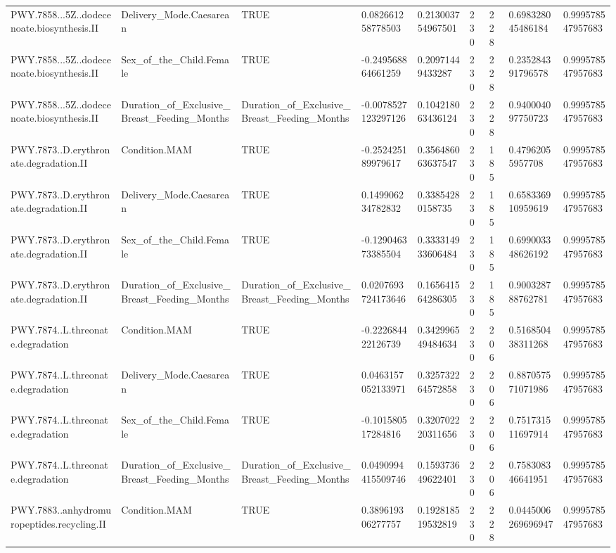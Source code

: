 \begin{longtable}{lllllllll}
PWY.7858...5Z..dodecenoate.biosynthesis.II & Delivery\_Mode.Caesarean & TRUE & 0.082661258778503 & 0.213003754967501 & 230 & 228 & 0.698328045486184 & 0.999578547957683 \\
PWY.7858...5Z..dodecenoate.biosynthesis.II & Sex\_of\_the\_Child.Female & TRUE & -0.249568864661259 & 0.20971449433287 & 230 & 228 & 0.235284391796578 & 0.999578547957683 \\
PWY.7858...5Z..dodecenoate.biosynthesis.II & Duration\_of\_Exclusive\_Breast\_Feeding\_Months & Duration\_of\_Exclusive\_Breast\_Feeding\_Months & -0.0078527123297126 & 0.104218063436124 & 230 & 228 & 0.940004097750723 & 0.999578547957683 \\
PWY.7873..D.erythronate.degradation.II & Condition.MAM & TRUE & -0.252425189979617 & 0.356486063637547 & 230 & 185 & 0.47962055957708 & 0.999578547957683 \\
PWY.7873..D.erythronate.degradation.II & Delivery\_Mode.Caesarean & TRUE & 0.149906234782832 & 0.33854280158735 & 230 & 185 & 0.658336910959619 & 0.999578547957683 \\
PWY.7873..D.erythronate.degradation.II & Sex\_of\_the\_Child.Female & TRUE & -0.129046373385504 & 0.333314933606484 & 230 & 185 & 0.699003348626192 & 0.999578547957683 \\
PWY.7873..D.erythronate.degradation.II & Duration\_of\_Exclusive\_Breast\_Feeding\_Months & Duration\_of\_Exclusive\_Breast\_Feeding\_Months & 0.0207693724173646 & 0.165641564286305 & 230 & 185 & 0.900328788762781 & 0.999578547957683 \\
PWY.7874..L.threonate.degradation & Condition.MAM & TRUE & -0.222684422126739 & 0.342996549484634 & 230 & 206 & 0.516850438311268 & 0.999578547957683 \\
PWY.7874..L.threonate.degradation & Delivery\_Mode.Caesarean & TRUE & 0.0463157052133971 & 0.325732264572858 & 230 & 206 & 0.887057571071986 & 0.999578547957683 \\
PWY.7874..L.threonate.degradation & Sex\_of\_the\_Child.Female & TRUE & -0.101580517284816 & 0.320702220311656 & 230 & 206 & 0.751731511697914 & 0.999578547957683 \\
PWY.7874..L.threonate.degradation & Duration\_of\_Exclusive\_Breast\_Feeding\_Months & Duration\_of\_Exclusive\_Breast\_Feeding\_Months & 0.0490994415509746 & 0.159373649622401 & 230 & 206 & 0.758308346641951 & 0.999578547957683 \\
PWY.7883..anhydromuropeptides.recycling.II & Condition.MAM & TRUE & 0.389619306277757 & 0.192818519532819 & 230 & 228 & 0.0445006269696947 & 0.999578547957683 \\

\end{longtable}
